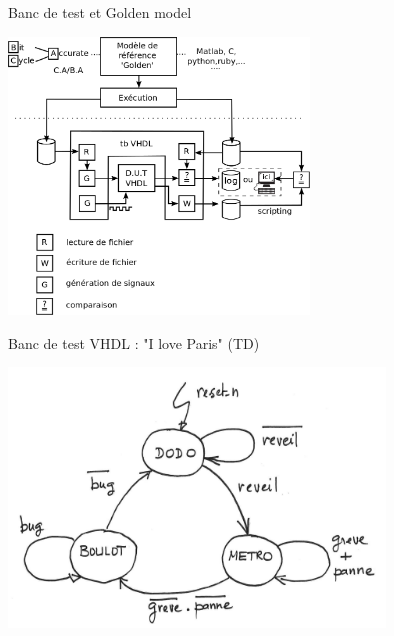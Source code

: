 \documentclass[xcolor=table]{beamer} %
\begin{document}
\begin{frame}{Banc de test et Golden model}
  \begin{center}
  \begin{minipage}[t]{8cm}
   \centering
   \includegraphics[width=8cm]{./figures/flot_testbench.png}
  \end{minipage}
  \end{center}
\end{frame}

\begin{frame}{Banc de test VHDL : "I love Paris" (TD)}
  \begin{center}
  \begin{minipage}[t]{15cm}
   \includegraphics[width=10cm]{./figures/iloveparis.png}
  \end{minipage}
  \end{center}
\end{frame}
\end{document}
